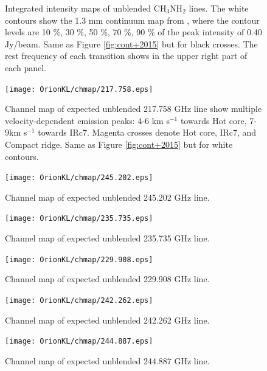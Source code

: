 \begin{figure}[H]
\begin{center}
\label{fig:mom0s}
\caption{Integrated intensity maps of unblended CH$_{3}$NH$_{2}$ lines. 
The white contours show the 1.3 mm continuum map from \citet{Hirota+2015},
where the contour levels are 10 \%, 30 \%, 50 \%, 70 \%, 90 \% of the peak intensity of 0.40 Jy/beam.
Same as Figure \ref{fig:cont+2015} but for black crosses. The rest frequency of each transition shows in the upper right part of each panel.}
\end{center}
\end{figure}

\begin{figure}[H]
  \centering
  \texttt{[image: OrionKL/chmap/217.758.eps]}
  \caption{
  Channel map of expected unblended 217.758 GHz line show multiple velocity-dependent 
  emission peaks: 4-6 km s$^{-1}$ towards Hot core, 7-9km s$^{-1}$ towards IRc7. 
  Magenta crosses denote Hot core, IRc7, and Compact ridge. Same as Figure \ref{fig:cont+2015} but for white contours.}
  \label{ch_0}
\end{figure}

\begin{figure}[H]
  \centering
  \texttt{[image: OrionKL/chmap/245.202.eps]}
  \caption{Channel map of expected unblended 245.202 GHz line.}
  \label{ch_1}
\end{figure}

\begin{figure}[H]
  \centering
  \texttt{[image: OrionKL/chmap/235.735.eps]}
  \caption{Channel map of expected unblended 235.735 GHz line.}
  \label{ch_2}
\end{figure}

\begin{figure}[H]
  \centering
  \texttt{[image: OrionKL/chmap/229.908.eps]}
  \caption{Channel map of expected unblended 229.908 GHz line.}
  \label{ch_3}
\end{figure}

\begin{figure}[H]
  \centering
  \texttt{[image: OrionKL/chmap/242.262.eps]}
  \caption{Channel map of expected unblended 242.262 GHz line.}
  \label{ch_4}
\end{figure}

\begin{figure}[H]
  \centering
  \texttt{[image: OrionKL/chmap/244.887.eps]}
  \caption{Channel map of expected unblended 244.887 GHz line.}
  \label{ch_5}
\end{figure}

